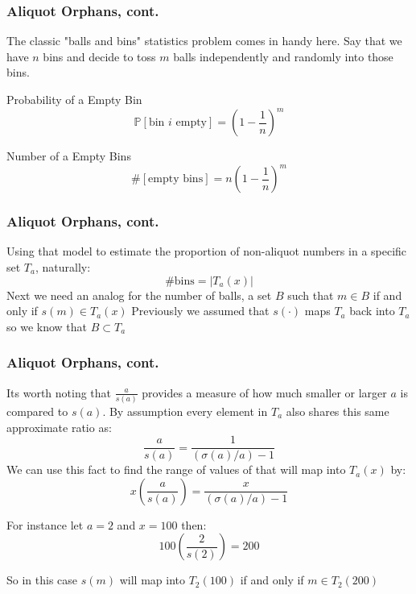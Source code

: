 \documentclass{beamer}
\begin{document}
\begin{frame}
\frametitle{Aliquot Orphans, cont.}
The classic "balls and bins"  statistics problem \textcolor{blue}{\cite{ballsBins}} comes in handy here.  Say that we have $n$ bins and decide to toss $m$ balls independently and randomly into those bins. 
\begin{block}{Probability of a Empty Bin}
{\large$$ \mathbb{P}[\text{bin } i \text{ empty}] = (1- \frac{1}{n})^m$$}
\end{block}

\begin{block}{Number of a Empty Bins}
{\large$$ \# [\text{empty bins}] = n(1- \frac{1}{n})^m$$}
\end{block}
\end{frame}

\begin{frame}
\frametitle{Aliquot Orphans, cont.}
Using that model to estimate the proportion of non-aliquot numbers in a specific set $T_a$, naturally: $$\text{\# bins} = |T_a(x)|$$
Next we need an analog for the number of balls, a set $B$ such that $m \in B$ if and only if $s(m) \in T_a(x)$  \linebreak \linebreak
Previously we assumed that $s(\cdot)$ maps $T_a$ back into $T_a$ so we know that $B \subset T_a$
\end{frame}

\begin{frame}
\frametitle{Aliquot Orphans, cont.}
Its worth noting that $\frac{a}{s(a)}$ provides a measure of how much smaller or larger $a$ is compared to $s(a)$. By assumption every element in $T_a$ also shares this same approximate ratio as: $$\frac{a}{s(a)} = \frac{1}{(\sigma(a)/a)-1}$$
We can use this fact to find the range of values of that will map into $T_a(x)$ by: $$x \left(\frac{a}{s(a)}\right) = \frac{x}{(\sigma(a)/a)-1}$$


For instance let $a = 2$ and $x=100$ then: $$100\left( \frac{2}{s(2)}\right) = 200$$

So in this case $s(m)$ will map into $T_2(100)$ if and only if $m \in T_2(200)$

\end{frame}

\end{document}
